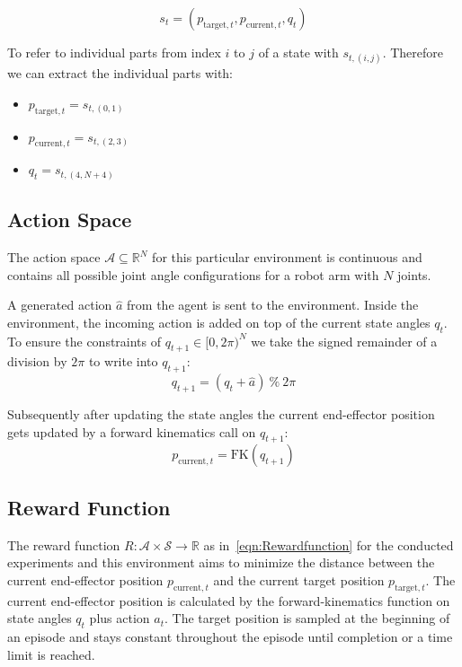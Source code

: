 \begin{equation}\label{eqn:state}
    s_t = (p_{\text{target}, t}, p_{\text{current}, t}, q_t)
\end{equation}

To refer to individual parts from index $i$ to $j$ of a state with $s_{t, (i, j)}$. Therefore we can extract the individual parts with:
\begin{itemize}
    \item $p_{\text{target}, t} = s_{t, (0, 1)}$ 
    \item $p_{\text{current}, t} = s_{t, (2, 3)}$
    \item $q_{t} = s_{t, (4, N + 4)}$
\end{itemize}

\subsection{Action Space}

The action space $\mathcal{A} \subseteq \mathbb{R}^N$ for this particular environment is continuous and contains all possible joint angle configurations for a robot arm with $N$ joints. 

A generated action $\hat{a}$ from the agent is sent to the environment. Inside the environment, the incoming action is added on top of the current state angles $q_t$. To ensure the constraints of $q_{t+1} \in [0, 2\pi)^N$ we take the signed remainder of a division by $2\pi$ to write into $q_{t+1}$:
\begin{equation*}
    q_{t+1} = (q_t + \hat{a}) \ \% \ 2\pi
\end{equation*}

Subsequently after updating the state angles the current end-effector position gets updated by a forward kinematics call on $q_{t+1}$:
\begin{equation*}
    p_{\text{current}, t} = \text{FK}(q_{t+1})
\end{equation*}


\subsection{Reward Function}

The reward function $R: \mathcal{A} \times \mathcal{S} \to \mathbb{R}$ as in~\eqref{eqn:Rewardfunction} for the conducted experiments and this environment aims to minimize the distance between the current end-effector position $p_{\text{current}, t}$ and the current target position $p_{\text{target}, t}$. The current end-effector position is calculated by the forward-kinematics function on state angles $q_t$ plus action $a_t$. The target position is sampled at the beginning of an episode and stays constant throughout the episode until completion or a time limit is reached. 

